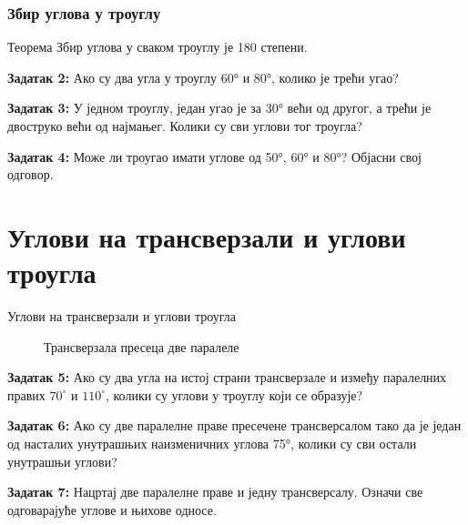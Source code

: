 \documentclass[12pt]{beamer}
\begin{document}
\begin{frame}\frametitle{Збир углова у троуглу}

\begin{block}{Теорема}
Збир углова у сваком троуглу је 180 степени.
\end{block}

\textbf{Задатак 2:}
Ако су два угла у троуглу 60° и 80°, колико је трећи угао?


\textbf{Задатак 3:}
У једном троуглу, један угао је за 30° већи од другог, а трећи је двоструко већи од најмањег. Колики су сви углови тог троугла?

\textbf{Задатак 4:}
Може ли троугао имати углове од 50°, 60° и 80°? Објасни свој одговор.

\end{frame}


\section{Углови на трансверзали и углови троугла}
\begin{frame}{Углови на трансверзали и углови троугла}

\begin{figure}[!ht]
\centering
{}%
\caption{Трансверзала пресеца две паралеле}
\label{transverzala}
\end{figure}

\textbf{Задатак 5:}
Ако су два угла на истој страни трансверзале и између паралелних правих $70^\circ$ и $110^\circ$, колики су углови у троуглу који се образује?

\textbf{Задатак 6:}
Ако су две паралелне праве пресечене трансверсалом тако да је један од насталих унутрашњих наизменичних углова 75°, колики су сви остали унутрашњи углови?

\textbf{Задатак 7:}
Нацртај две паралелне праве и једну трансверсалу. Означи све одговарајуће углове и њихове односе.

\end{frame}
\end{document}

